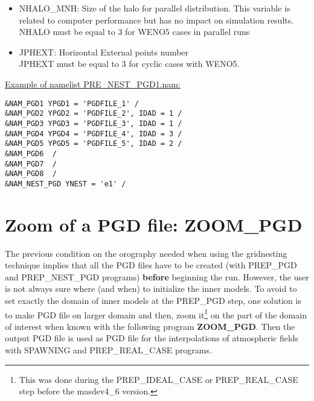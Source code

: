 \begin{enumerate}
\begin{itemize}
\item
NHALO\_MNH: Size of the halo for parallel distribution.
This variable is related to computer performance but has no
impact on simulation results.\\
NHALO must be equal to 3 for WENO5 cases in parallel runs

\item
JPHEXT:  Horizontal External points number\\
JPHEXT must be equal to 3 for cyclic cases with WENO5.
\end{itemize}

\end{enumerate}



\underline{Example of namelist PRE\_NEST\_PGD1.nam:}
\begin{verbatim}
&NAM_PGD1 YPGD1 = 'PGDFILE_1' /
&NAM_PGD2 YPGD2 = 'PGDFILE_2', IDAD = 1 /
&NAM_PGD3 YPGD3 = 'PGDFILE_3', IDAD = 1 /
&NAM_PGD4 YPGD4 = 'PGDFILE_4', IDAD = 3 /
&NAM_PGD5 YPGD5 = 'PGDFILE_5', IDAD = 2 /
&NAM_PGD6  /
&NAM_PGD7  /
&NAM_PGD8  /
&NAM_NEST_PGD YNEST = 'e1' /
\end{verbatim}


\section{Zoom of a PGD file: {\bf ZOOM\_PGD}}
The previous condition on the orography needed
when using the gridnesting technique implies that all the PGD files have to be
created (with {PREP\_PGD} and {PREP\_NEST\_PGD} programs)
{\bf before} beginning the run.
However, the user is not always sure where (and when) to initialize
the inner models.
To avoid to set exactly the domain of inner models at the PREP\_PGD step, 
one solution is to make PGD file on larger domain
and then, zoom it\footnote{This was done during the PREP\_IDEAL\_CASE or 
PREP\_REAL\_CASE step before the masdev4\_6 version.}
 on the part of the domain of interest when known
with the following program {\bf ZOOM\_PGD}. Then the output PGD file is used
as PGD file for the interpolations of atmospheric fields
with {SPAWNING} and {PREP\_REAL\_CASE} programs. 



